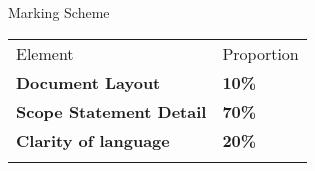 \begin{large}
Marking Scheme 
\end{large}


\begin{table}[h!]
     \begin{center}
     \begin{tabular}{p{9cm}  p{3cm} }
     \toprule
      \textbf\large{Element} & \textbf\large{Proportion} \\ 
    \cmidrule(r){1-1}\cmidrule(lr){2-2}
      \textbf{Document Layout} & \textbf{10\%}\\
      \textbf{Scope Statement Detail} & \textbf{70\%}\\
      \textbf{Clarity of language} & \textbf{20\%}\\
      \\ \bottomrule
      \end{tabular}
      \label{tbl:markSchemeAsmt3}
      \end{center}
 \end{table}

